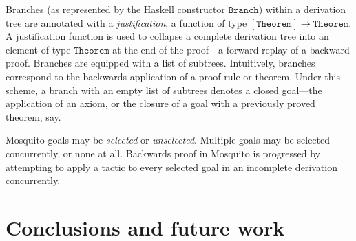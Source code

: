 \documentclass{llncs}
\begin{document}
Branches (as represented by the Haskell constructor $\mathtt{Branch}$) within a derivation tree are annotated with a \emph{justification}, a function of type $\mathtt{[Theorem]} \rightarrow \mathtt{Theorem}$.
A justification function is used to collapse a complete derivation tree into an element of type $\mathtt{Theorem}$ at the end of the proof---a forward replay of a backward proof.
Branches are equipped with a list of subtrees.
Intuitively, branches correspond to the backwards application of a proof rule or theorem.
Under this scheme, a branch with an empty list of subtrees denotes a closed goal---the application of an axiom, or the closure of a goal with a previously proved theorem, say.

Mosquito goals may be \emph{selected} or \emph{unselected}.
Multiple goals may be selected concurrently, or none at all.
Backwards proof in Mosquito is progressed by attempting to apply a tactic to every selected goal in an incomplete derivation concurrently.

\section{Conclusions and future work}
\label{sect.conclusions}


\end{document}
